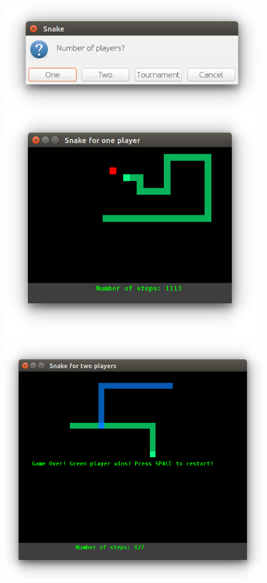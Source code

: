 \begin{figure}[H]
\begin{minipage}{0.45\textwidth}
\includegraphics[width=1.0\textwidth]{../img/snake-start}

\includegraphics[width=1.0\textwidth]{../img/snake-oneplayer}
\end{minipage}
\begin{minipage}{0.5\textwidth}
\includegraphics[width=1.0\textwidth]{../img/snake-twoplayer}

\end{minipage}
\end{figure}
